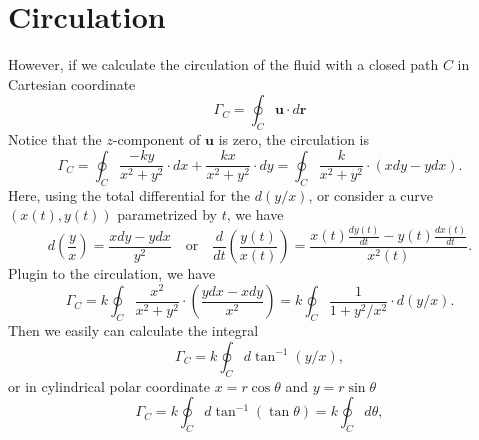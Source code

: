 \documentclass[12pt]{article}
\begin{document}
\section{Circulation}
However, if we calculate the circulation of the fluid with a closed path $C$ in Cartesian coordinate
\begin{equation}
\Gamma_C 
= \oint_C \textbf{u}\cdot d\textbf{r}
\end{equation}
Notice that the $z$-component of $\textbf{u}$ is zero, the circulation is 
\begin{equation}
\Gamma_C 
= \oint_C \frac{-ky}{x^2 + y^2}\cdot dx + \frac{kx}{x^2 + y^2}\cdot dy 
= \oint_C \frac{k}{x^2+y^2}\cdot \left(xdy-ydx\right).
\end{equation}
Here, using the total differential for the $d(y/x)$, or consider a curve $(x(t),y(t))$ parametrized by $t$, we have
\begin{equation}
d\left(\frac{y}{x}\right) = \frac{xdy-ydx}{y^2}
\quad\text{or}\quad
\frac{d}{dt}\left(\frac{y(t)}{x(t)}\right) 
= \frac{\displaystyle x(t) \frac{dy(t)}{dt} - y(t) \frac{dx(t)}{dt}}{x^2(t)}.
\end{equation}
Plugin to the circulation, we have
\begin{equation}
\Gamma_C 
= k\oint_C \frac{x^2}{x^2+y^2}\cdot \left(\frac{ydx-xdy}{x^2}\right)
= k\oint_C \frac{1}{1+y^2/x^2}\cdot d\left(y/x\right).
\end{equation}
Then we easily can calculate the integral 
\begin{equation}
\Gamma_C = k\oint_C d\tan^{-1}(y/x),
\end{equation}
or in cylindrical polar coordinate $x=r\cos\theta$ and $y=r\sin\theta$
\begin{equation}
\Gamma_C = k\oint_C d\tan^{-1}(\tan\theta) = k\oint_C d\theta,
\end{equation}

\noindent{}
\end{document}
